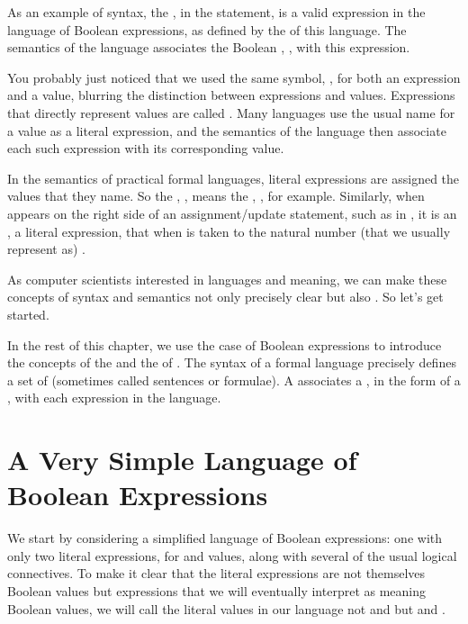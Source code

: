 \documentclass[letterpaper,10pt,english]{sphinxmanual}
\begin{document}
As an example of syntax, the , in the statement,  is a valid expression in the language of Boolean expressions,
as defined by the  of this language. The semantics of the
language associates the Boolean , , with this expression.

You probably just noticed that we used the same symbol, , for
both an expression and a value, blurring the distinction between
expressions and values. Expressions that directly represent values are
called . Many languages use the usual name for a
value as a literal expression, and the semantics of the language then
associate each such expression with its corresponding value.

In the semantics of practical formal languages, literal expressions
are assigned the values that they name. So the , ,
means the , , for example. Similarly, when  appears on
the right side of an assignment/update statement, such as in ,
it is an , a literal expression, that when  is
taken to  the natural number (that we usually represent as) .

As computer scientists interested in languages and meaning, we can
make these concepts of syntax and semantics not only precisely clear
but also . So let’s get started.

In the rest of this chapter, we use the case of Boolean expressions to
introduce the concepts of the  and the  of . The syntax of a formal language precisely defines a set of
 (sometimes called sentences or formulae). A 
associates a , in the form of a , with each expression
in the language.


\section{A Very Simple Language of Boolean Expressions}
\label{\detokenize{10-formal-languages:a-very-simple-language-of-boolean-expressions}}
We start by considering a simplified language of Boolean expressions:
one with only two literal expressions, for  and  values,
along with several of the usual logical connectives.  To make it clear
that the literal expressions are not themselves Boolean values but
expressions that we will eventually interpret as meaning Boolean
values, we will call the literal values in our language not  and
 but  and .
\end{document}
